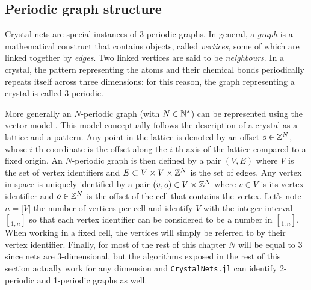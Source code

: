 \documentclass[main.tex]{subfiles}
\begin{document}
\subsection{Periodic graph structure}

\label{periodicgraphs}



Crystal nets are special instances of 3-periodic graphs. In general, a \emph{graph} is a mathematical construct that contains objects, called \emph{vertices}, some of which are linked together by \emph{edges}. Two linked vertices are said to be \emph{neighbours}. In a crystal, the pattern representing the atoms and their chemical bonds periodically repeats itself across three dimensions: for this reason, the graph representing a crystal is called 3-periodic.

More generally an $N$-periodic graph (with $N\in\mathbb{N}^*$) can be represented using the vector model \autocite{Chung}. This model conceptually follows the description of a crystal as a lattice and a pattern. Any point in the lattice is denoted by an offset $o\in\mathbb{Z}^N$, whose $i$-th coordinate is the offset along the $i$-th axis of the lattice compared to a fixed origin. An $N$-periodic graph is then defined by a pair $(V,E)$ where $V$ is the set of vertex identifiers and $E\subset V\times V\times \mathbb{Z}^N$ is the set of edges. Any vertex in space is uniquely identified by a pair $(v,o)\in V\times\mathbb{Z}^N$ where $v\in V$ is its vertex identifier and $o\in\mathbb{Z}^N$ is the offset of the cell that contains the vertex. Let's note $n = \left|V\right|$ the number of vertices per cell and identify $V$ with the integer interval $\brack{1,n}$ so that each vertex identifier can be considered to be a number in $\brack{1,n}$. When working in a fixed cell, the vertices will simply be referred to by their vertex identifier.
Finally, for most of the rest of this chapter $N$ will be equal to $3$ since nets are 3-dimensional, but the algorithms exposed in the rest of this section actually work for any dimension and \texttt{CrystalNets.jl} can identify 2-periodic and 1-periodic graphs as well.
\end{document}
